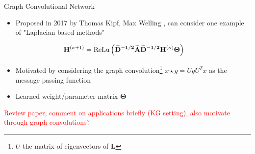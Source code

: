 \documentclass{beamer}
\newcommand{\node}{v}
\newcommand{\nrepresent}{h}
\newcommand{\NodeRepMat}{\mathbf{H}}
\newcommand{\edge}{e}
\newcommand{\DegMat}{\mathbf{D}}
\newcommand{\iter}{\kappa}
\newcommand{\AdjMat}{\mathbf{A}}
\newcommand{\LapMat}{\mathbf{L}}
\newcommand{\ReLu}{\text{ReLu}}
\begin{document}
\begin{frame}{Graph Convolutional Network}
    \begin{itemize}
    \item Proposed in 2017 by Thomas Kipf, Max Welling \cite{kipf_semi-supervised_2017}, can consider one example of "Laplacian-based methods" \cite{gilmer_neural_2017} 
    \end{itemize}
    
        \begin{align*}
        \iffalse
            \mathbf{\nrepresent}_\node^{(\iter+1)} 
            &=
            \text{Update}
            \left( 
            x_\node^{(\iter)}
            ,   
            \text{Aggregate}
            (
                \nrepresent_\node^{(\iter)}, x_u^{(\iter)}, \edge_{u,\node}^{(\iter)}
            )
            \right)
        \\
        \fi 
            \NodeRepMat^{(\iter+1)} 
            &=
            \ReLu
            \left( 
                \mathbf{
                \widetilde{\DegMat}^{-1/2}
                \widetilde{\AdjMat}
                \widetilde{\DegMat}^{-1/2}  
                \NodeRepMat^{(\iter)}
                \Theta 
                }            
            \right)
    \end{align*}
    
    \begin{itemize}
        \item Motivated by considering the graph convolution\footnote{$U$ the matrix of eigenvectors of $\LapMat$} $x \star g = UgU^Tx$ as the message passing function 
        \item Learned weight/parameter matrix $\boldsymbol\Theta$
    \end{itemize}
    \textcolor{red}{Review paper, comment on applications briefly (KG setting), also motivate through graph convolutions?}
    \end{frame}
\end{document}
